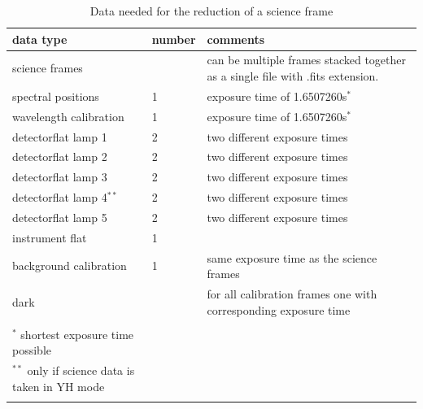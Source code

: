 \documentclass[twoside,single]{lion-msc}
\begin{document}
\begin{longtable}{| p{} | p{} | p{ }|}
\hline
\textbf{data type} & \textbf{number} & \textbf{comments}\\\hline
science frames&  &can be multiple frames stacked together as a single file with .fits extension.\\\hline
spectral positions & 1 & exposure time of 1.6507260s$^*$	\\\hline	
wavelength calibration & 1 & exposure time of 1.6507260s$^*$ \\\hline
detectorflat lamp 1 & 2 & two different exposure times\\\hline
detectorflat lamp 2 & 2 & two different exposure times\\\hline
detectorflat lamp 3 & 2 & two different exposure times\\\hline
detectorflat lamp 4$^{**}$ & 2 & two different exposure times\\\hline
detectorflat lamp 5 & 2 & two different exposure times\\\hline
instrument flat & 1 & \\\hline
background calibration & 1 & same exposure time as the science frames\\\hline
dark & & for all calibration frames one with corresponding exposure time\\\hline
\caption*{\\$^*$ shortest exposure time possible\\ $^{**}$ only if science data is taken in YH mode}\\%
\caption{Data needed for the reduction of a science frame}%
\label{Tab:data}
\end{longtable}%
\end{document}
